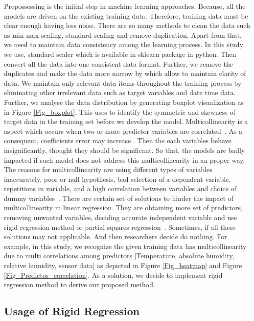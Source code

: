 Prepossessing is the initial step in machine learning approaches.
Because, all the models are driven on the existing training data. 
Therefore, training data must be clear enough having less noise.
There are so many methods to clean the data such as min-max scaling,
standard scaling and remove duplication.
Apart from that, we need to maintain data consistency among the learning process.
In this study we use, standard scaler which is available in sklearn package in python.
Then convert all the data into one consistent data format.
Further, we remove the duplicates and 
make the data more narrow by which allow to maintain clarity of data.
We maintain only relevant data items throughout the training process 
by eliminating other irrelevant data such as target variables and date time data.
Further, we analyse the data distribution 
by generating boxplot visualization as in Figure \cref{Fig_boxplot}.
This uses to identify the symmetric 
and skewness of target data in the training set before we develop the model.
Multicollinearity is a aspect which 
occurs when two or more predictor variables are correlated~\cite{uyanik2013study}. 
As a consequent, coefficients error may increase \cite{uyanik2013study}.
Then the each variables behave insignificantly, 
thought they should be significant. 
So that, the models are badly impacted 
if such model does not address this multicollinearity in an proper way.
The reasons for multicollinearity are using different 
types of variables inaccurately,
poor or null hypothesis, bad selection of a dependent variable, 
repetitions in variable, and 
a high correlation between variables and 
choice of dummy variables~\cite{farrar1967multicollinearity}.
There are certain set of solutions to 
hinder the impact of multicollinearity in linear regression.
They are obtaining more set of predictors, removing 
unwanted variables, deciding accurate independent variable 
and use rigid regression method or partial squares regression~\cite{farrar1967multicollinearity}.
Sometimes, if all these solutions may not applicable.
And then researchers decide do nothing.
For example, in this study, 
we recognize the given training data has multicollinearity due to multi 
correlations among predictors [Temperature, absolute humidity, relative humidity, sensor data] 
as depicted in Figure \ref{Fig_heatmap} and Figure \ref{Fig_Predictor_correlation}.
As a solution, we decide to implement rigid regression method 
to derive our proposed method.


\subsection{Usage of Rigid Regression}

